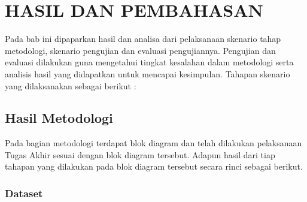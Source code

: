 \chapter{HASIL DAN PEMBAHASAN}
\label{bab4}


Pada bab ini dipaparkan hasil dan analisa dari pelaksanaan skenario tahap  metodologi, skenario pengujian dan evaluasi pengujiannya. Pengujian dan evaluasi dilakukan guna mengetahui tingkat kesalahan dalam metodologi serta analisis hasil yang didapatkan untuk mencapai kesimpulan. Tahapan skenario yang dilaksanakan sebagai berikut :



\section{Hasil Metodologi}
Pada bagian metodologi terdapat blok diagram dan telah dilakukan pelaksanaan Tugas Akhir sesuai dengan blok diagram tersebut. Adapun hasil dari tiap tahapan yang dilakukan pada blok diagram tersebut secara rinci sebagai berikut.

\subsection{Dataset}

